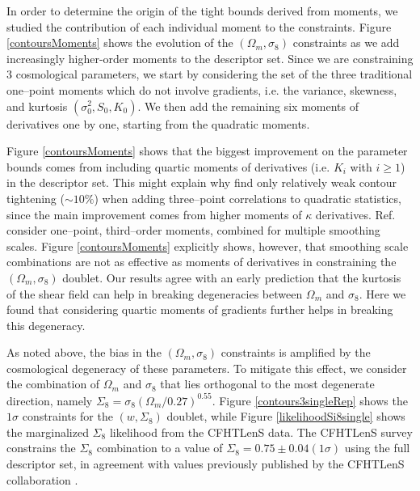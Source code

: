 \documentclass[reprint,aps,prd,superscriptaddress,showkeys,showpacs]{revtex4-1}
\begin{document}
In order to determine the origin of the tight bounds derived from
moments, we studied the contribution of each individual moment to the
constraints. Figure \ref{contoursMoments} shows the evolution of the
$(\Omega_m,\sigma_8)$ constraints as we add increasingly higher-order
moments to the descriptor set. Since we are constraining 3
cosmological parameters, we start by considering the set of the three
traditional one--point moments which do not involve gradients,
i.e. the variance, skewness, and kurtosis $(\sigma_0^2,S_0,K_0)$. We
then add the remaining six moments of derivatives one by one, starting
from the quadratic moments. 

Figure \ref{contoursMoments} shows that the biggest improvement on the
parameter bounds comes from including quartic moments of derivatives
(i.e. $K_i$ with $i\ge1$) in the descriptor set. This might explain
why \citep{CFHTFu} find only relatively weak contour tightening
($\sim10\%$) when adding three--point correlations to quadratic
statistics, since the main improvement comes from higher moments of
$\kappa$ derivatives. Ref.~\citep{CFHTFu} consider one--point,
third--order moments, combined for multiple smoothing scales. Figure
\ref{contoursMoments} explicitly shows, however, that smoothing scale
combinations are not as effective as moments of derivatives in
constraining the $(\Omega_m,\sigma_8)$ doublet. Our results agree with
an early prediction \citep{moments4} that the kurtosis of the shear
field can help in breaking degeneracies between $\Omega_m$ and
$\sigma_8$.  Here we found that considering quartic moments of
gradients further helps in breaking this degeneracy.

As noted above, the bias in the $(\Omega_m,\sigma_8)$ constraints is
amplified by the cosmological degeneracy of these parameters. To
mitigate this effect, we consider the combination of $\Omega_m$ and
$\sigma_8$ that lies orthogonal to the most degenerate direction,
namely $\Sigma_8=\sigma_8(\Omega_m/0.27)^{0.55}$. Figure
\ref{contours3singleRep} shows the $1\sigma$ constraints for the
$(w,\Sigma_8)$ doublet, while Figure \ref{likelihoodSi8single} shows
the marginalized $\Sigma_8$ likelihood from the CFHTLenS data. The
CFHTLenS survey constrains the $\Sigma_8$ combination to a value of
$\Sigma_8=0.75\pm0.04(1\sigma)$ using the full descriptor set, in
agreement with values previously published by the CFHTLenS
collaboration \citep{CFHTKilbinger}. 
\end{document}
